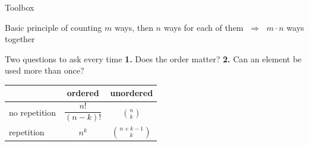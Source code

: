 \documentclass[aspectratio=169,11pt,usepdftitle=false]{beamer}
\begin{document}
\begin{frame}{Toolbox}
	\begin{block}{Basic principle of counting}
		\centering
		$m$ ways, then $n$ ways for each of them
		$\;\Longrightarrow\;$ \alert{$m\cdot n$} ways together
	\end{block}
	\begin{block}{Two questions to ask every time}
		\centering
		\textbf{1.} Does the order matter? \qquad
		\textbf{2.} Can an element be used more than once?
		\begin{center}
			\begin{tabular}{lcc}\toprule
				              & ordered              & unordered                       \\\midrule
				no repetition & $\dfrac{n!}{(n-k)!}$ & $\displaystyle\binom nk$        \\[5mm]
				repetition    & $n^k$                & $\displaystyle\binom{n+k-1}{k}$ \\\bottomrule
			\end{tabular}
		\end{center}
	\end{block}
\end{frame}

\end{document}
